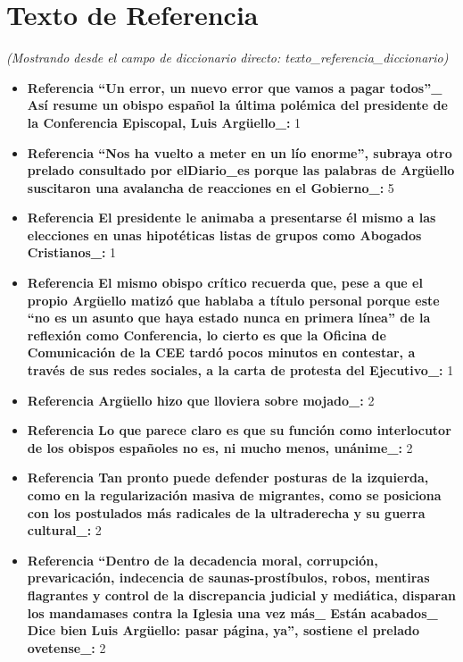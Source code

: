 \documentclass[10pt,a4paper]{article}
\begin{document}
\section*{Texto de Referencia}
    \textit{(Mostrando desde el campo de diccionario directo: texto\_referencia\_diccionario)}
    \begin{itemize}[leftmargin=*]
            \item \textbf{Referencia ``Un error, un nuevo error que vamos a pagar todos''\_ As\'{i} resume un obispo espa\~{n}ol la \'{u}ltima pol\'{e}mica del presidente de la Conferencia Episcopal, Luis Arg\"{u}ello\_:} 1
            \item \textbf{Referencia ``Nos ha vuelto a meter en un l\'{i}o enorme'', subraya otro prelado consultado por elDiario\_es porque las palabras de Arg\"{u}ello suscitaron una avalancha de reacciones en el Gobierno\_:} 5
            \item \textbf{Referencia El presidente le animaba a presentarse \'{e}l mismo a las elecciones en unas hipot\'{e}ticas listas de grupos como Abogados Cristianos\_:} 1
            \item \textbf{Referencia El mismo obispo cr\'{i}tico recuerda que, pese a que el propio Arg\"{u}ello matiz\'{o} que hablaba a t\'{i}tulo personal porque este ``no es un asunto que haya estado nunca en primera l\'{i}nea'' de la reflexi\'{o}n como Conferencia, lo cierto es que la Oficina de Comunicaci\'{o}n de la CEE tard\'{o} pocos minutos en contestar, a trav\'{e}s de sus redes sociales, a la carta de protesta del Ejecutivo\_:} 1
            \item \textbf{Referencia Arg\"{u}ello hizo que lloviera sobre mojado\_:} 2
            \item \textbf{Referencia Lo que parece claro es que su funci\'{o}n como interlocutor de los obispos espa\~{n}oles no es, ni mucho menos, un\'{a}nime\_:} 2
            \item \textbf{Referencia Tan pronto puede defender posturas de la izquierda, como en la regularizaci\'{o}n masiva de migrantes, como se posiciona con los postulados m\'{a}s radicales de la ultraderecha y su guerra cultural\_:} 2
            \item \textbf{Referencia ``Dentro de la decadencia moral, corrupci\'{o}n, prevaricaci\'{o}n, indecencia de saunas-prost\'{i}bulos, robos, mentiras flagrantes y control de la discrepancia judicial y medi\'{a}tica, disparan los mandamases contra la Iglesia una vez m\'{a}s\_ Est\'{a}n acabados\_ Dice bien Luis Arg\"{u}ello: pasar p\'{a}gina, ya'', sostiene el prelado ovetense\_:} 2

\end{itemize}
\end{document}
